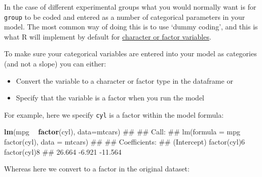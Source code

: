 \documentclass[]{article}
\newenvironment{Shaded}{\begin{snugshade}}{\end{snugshade}}
\newcommand{\KeywordTok}[1]{\textcolor[rgb]{0.13,0.29,0.53}{\textbf{#1}}}
\newcommand{\DataTypeTok}[1]{\textcolor[rgb]{0.13,0.29,0.53}{#1}}
\newcommand{\StringTok}[1]{\textcolor[rgb]{0.31,0.60,0.02}{#1}}
\newcommand{\OperatorTok}[1]{\textcolor[rgb]{0.81,0.36,0.00}{\textbf{#1}}}
\newcommand{\NormalTok}[1]{#1}
\providecommand{\tightlist}{%
  \setlength{\itemsep}{0pt}\setlength{\parskip}{0pt}}
\theoremstyle{definition}
\theoremstyle{definition}
\theoremstyle{definition}
\theoremstyle{remark}
\begin{document}
In the case of different experimental groups what you would normally
want is for \texttt{group} to be coded and entered as a number of
categorical parameters in your model. The most common way of doing this
is to use `dummy coding', and this is what R will implement by default
for \protect\hyperlink{character-and-factor}{character or factor
variables}.

To make sure your categorical variables are entered into your model as
categories (and not a slope) you can either:

\begin{itemize}
\tightlist
\item
  Convert the variable to a character or factor type in the dataframe or
\item
  Specify that the variable is a factor when you run the model
\end{itemize}

For example, here we specify \texttt{cyl} is a factor within the model
formula:

\begin{Shaded}
\begin{Highlighting}[]
\KeywordTok{lm}\NormalTok{(mpg }\OperatorTok{~}\StringTok{ }\KeywordTok{factor}\NormalTok{(cyl), }\DataTypeTok{data=}\NormalTok{mtcars)}
\NormalTok{## }
\NormalTok{## Call:}
\NormalTok{## lm(formula = mpg ~ factor(cyl), data = mtcars)}
\NormalTok{## }
\NormalTok{## Coefficients:}
\NormalTok{##  (Intercept)  factor(cyl)6  factor(cyl)8  }
\NormalTok{##       26.664        -6.921       -11.564}
\end{Highlighting}
\end{Shaded}

Whereas here we convert to a factor in the original dataset:

\begin{Shaded}
\end{Shaded}
\end{document}
